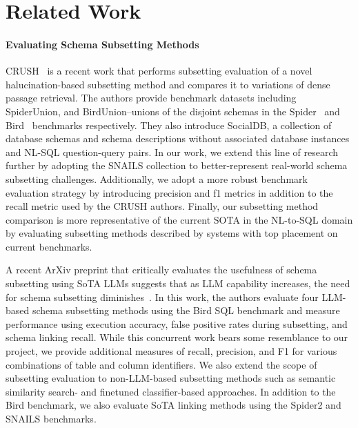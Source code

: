 \section{Related Work}


\paragraph{\textbf{Evaluating Schema Subsetting Methods}}
CRUSH~\cite{kothyari-etal-2023-crush4sql} is a recent work that performs subsetting evaluation of a novel halucination-based subsetting method and compares it to variations of dense passage retrieval.
The authors provide benchmark datasets including SpiderUnion, and BirdUnion--unions of the disjoint schemas in the Spider~\cite{benchmark-spider} and Bird~\cite{benchmark-bird} benchmarks respectively. They also introduce SocialDB, a collection of database schemas and schema descriptions without associated database instances and NL-SQL question-query pairs.
In our work, we extend this line of research further by adopting the  SNAILS collection to better-represent real-world schema subsetting challenges.
Additionally, we adopt a more robust benchmark evaluation strategy by introducing precision and f1 metrics in addition to the recall metric used by the CRUSH authors.
Finally, our subsetting method comparison is more representative of the current SOTA in the NL-to-SQL domain by evaluating subsetting methods described by systems with top placement on current benchmarks.

A recent ArXiv preprint that critically evaluates the usefulness of schema subsetting using SoTA LLMs suggests that as LLM capability increases, the need for schema subsetting diminishes~\cite{maamari2024deathschemalinkingtexttosql}.
In this work, the authors evaluate four LLM-based schema subsetting methods using the Bird SQL benchmark and measure performance using execution accuracy, false positive rates during subsetting, and schema linking recall.
While this concurrent work bears some resemblance to our \PROJECTNAME{ } project, we provide additional measures of recall, precision, and F1 for various combinations of table and column identifiers.
We also extend the scope of subsetting evaluation to non-LLM-based subsetting methods such as semantic similarity search- and finetuned classifier-based approaches.
In addition to the Bird benchmark, we also evaluate SoTA linking methods using the Spider2 and SNAILS benchmarks.

